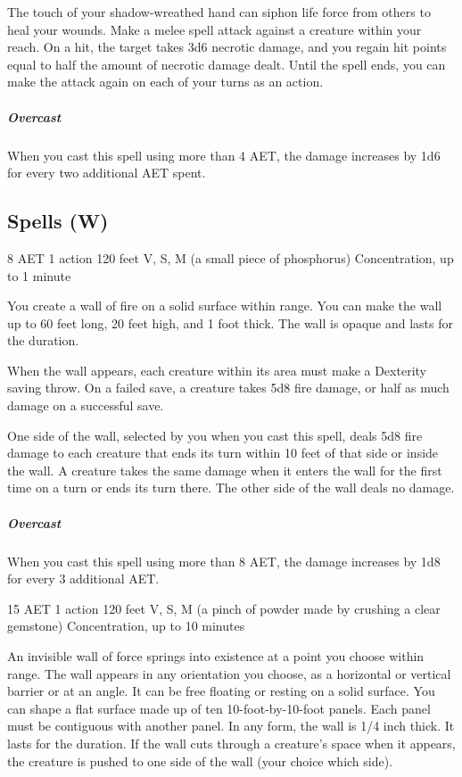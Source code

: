The touch of your shadow-wreathed hand can siphon life force from others to heal your wounds. Make a melee spell attack against a creature within your reach. On a hit, the target takes 3d6 necrotic damage, and you regain hit points equal to half the amount of necrotic damage dealt. Until the spell ends, you can make the attack again on each of your turns as an action.

\subparagraph*{Overcast} When you cast this spell using more than 4 AET, the damage increases by 1d6 for every two additional AET spent.

\subsection{Spells (W)}

{8 AET}
{1 action}
{120 feet}
{V, S, M (a small piece of phosphorus)}
{Concentration, up to 1 minute}

You create a wall of fire on a solid surface within range. You can make the wall up to 60 feet long, 20 feet high, and 1 foot thick. The wall is opaque and lasts for the duration.

When the wall appears, each creature within its area must make a Dexterity saving throw. On a failed save, a creature takes 5d8 fire damage, or half as much damage on a successful save.

One side of the wall, selected by you when you cast this spell, deals 5d8 fire damage to each creature that ends its turn within 10 feet of that side or inside the wall. A creature takes the same damage when it enters the wall for the first time on a turn or ends its turn there. The other side of the wall deals no damage.

\subparagraph*{Overcast} When you cast this spell using more than 8 AET, the damage increases by 1d8 for every 3 additional AET.


{15 AET}
{1 action}
{120 feet}
{V, S, M (a pinch of powder made by crushing a clear gemstone)}
{Concentration, up to 10 minutes}

An invisible wall of force springs into existence at a point you choose within range. The wall appears in any orientation you choose, as a horizontal or vertical barrier or at an angle. It can be free floating or resting on a solid surface. You can shape a flat surface made up of ten 10-foot-by-10-foot panels. Each panel must be contiguous with another panel. In any form, the wall is 1/4 inch thick. It lasts for the duration. If the wall cuts through a creature's space when it appears, the creature is pushed to one side of the wall (your choice which side).

